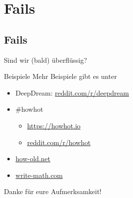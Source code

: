 \section{Fails}
\subsection{Fails}
\begin{frame}{}
    \begin{center}
        \Huge Sind wir (bald) überflüssig?
    \end{center}
\end{frame}


\begin{frame}{Beispiele}
    Mehr Beispiele gibt es unter

    \begin{itemize}
        \item DeepDream: \href{https://www.reddit.com/r/deepdream/}{reddit.com/r/deepdream}
        \item \#howhot
        \begin{itemize}
            \item \href{https://howhot.io/}{https://howhot.io}
            \item \href{https://www.reddit.com/r/howhot/}{reddit.com/r/howhot}
        \end{itemize}
        \item \href{http://how-old.net/}{how-old.net}
        \item \href{http://write-math.com}{write-math.com}
    \end{itemize}

    \begin{center}
        \Huge Danke für eure Aufmerksamkeit!
    \end{center}
\end{frame}